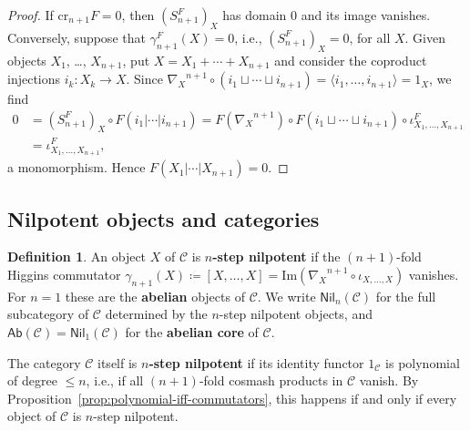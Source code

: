 \documentclass[reqno,a4paper]{amsart}
\theoremstyle{plain}
\theoremstyle{definition}
\newtheorem{definition}[subsection]{Definition}
\newcommand{\defn}{\textbf}
\newcommand{\DefEq}{\coloneq}
\newcommand{\C}{\ensuremath{\mathcal{C}}}
\newcommand{\Ab}{\ensuremath{\mathsf{Ab}}}
\newcommand{\Nil}{\ensuremath{\mathsf{Nil}}}
\newcommand{\cre}{\ensuremath{\mathrm{cr}}}
\renewcommand{\Im}{\ensuremath{\mathrm{Im}}}
\newcommand{\cosum}{\ensuremath{\sqcup}}                   %
\newcommand{\fold}[1]{\ensuremath{\nabla_{#1}}}            %
\begin{document}
\begin{proof}
  If \(\cre_{n+1}F=0\), then \((S^{F}_{n+1})_{X}\) has domain \(0\) and its image vanishes. Conversely, suppose that \(\gamma^{F}_{n+1}(X)=0\), i.e., \((S^{F}_{n+1})_{X}=0\), for all \(X\). Given objects \(X_{1}\), \dots, \(X_{n+1}\), put \(X=X_{1}+\cdots+X_{n+1}\) and consider the coproduct injections \(i_{k}\colon X_{k}\to X\). Since \(\fold{X}^{n+1}\circ(i_{1}\cosum\cdots\cosum i_{n+1})=\langle i_{1},\dots,i_{n+1}\rangle=1_{X}\), we find
  \begin{align*}
    0 & =(S^{F}_{n+1})_{X}\circ F(i_{1}|\cdots|i_{n+1})=F(\fold{X}^{n+1})\circ F(i_{1}\cosum\cdots\cosum i_{n+1})\circ\iota^{F}_{X_{1},\dots,X_{n+1}} \\
      & =\iota^{F}_{X_{1},\dots,X_{n+1}}\text{,}
  \end{align*}
  a monomorphism. Hence \(F(X_{1}|\cdots|X_{n+1})=0\).
\end{proof}

\subsection{Nilpotent objects and categories}\label{sec:nilpotent}

\begin{definition}\label{def:nilpotent}
  An object \(X\) of \(\C\) is \defn{\(n\)-step nilpotent} if the \((n+1)\)-fold Higgins commutator \(\gamma_{n+1}(X)\DefEq[X,\dots,X]=\Im(\fold{X}^{n+1}\circ\iota_{X,\dots,X})\) vanishes. For \(n=1\) these are the \defn{abelian} objects of \(\C\). We write \(\Nil_{n}(\C)\) for the full subcategory of \(\C\) determined by the \(n\)-step nilpotent objects, and \(\Ab(\C)=\Nil_{1}(\C)\) for the \defn{abelian core} of \(\C\).

  The category \(\C\) itself is \defn{\(n\)-step nilpotent} if its identity functor \(1_{\C}\) is polynomial of degree \(\leq n\), i.e., if all \((n+1)\)-fold cosmash products in \(\C\) vanish. By Proposition~\ref{prop:polynomial-iff-commutators}, this happens if and only if every object of \(\C\) is \(n\)-step nilpotent.
\end{definition}
\end{document}
